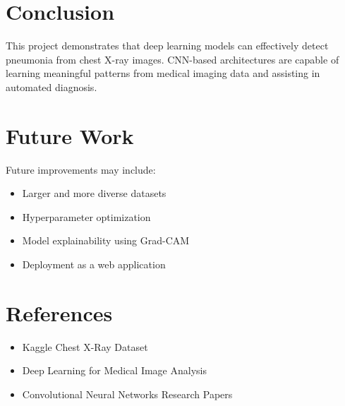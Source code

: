 \documentclass[12pt]{article}
\begin{document}
\section{Conclusion}

This project demonstrates that deep learning models can effectively detect
pneumonia from chest X-ray images. CNN-based architectures are capable of
learning meaningful patterns from medical imaging data and assisting in
automated diagnosis.

\section{Future Work}

Future improvements may include:

\begin{itemize}
\item Larger and more diverse datasets
\item Hyperparameter optimization
\item Model explainability using Grad-CAM
\item Deployment as a web application
\end{itemize}

\section{References}

\begin{itemize}
\item Kaggle Chest X-Ray Dataset
\item Deep Learning for Medical Image Analysis
\item Convolutional Neural Networks Research Papers
\end{itemize}
\end{document}
